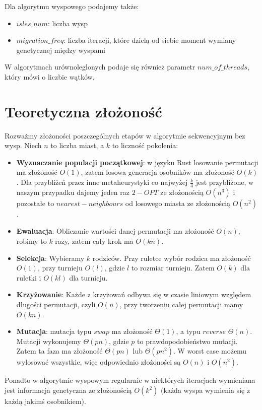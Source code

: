 \documentclass{article}
\begin{document}
Dla algorytmu wyspowego podajemy także:
\begin{itemize}
\item $isles\_num$: liczba wysp 
\item $migration\_freq$: liczba iteracji, które dzielą od siebie moment wymiany genetycznej między wyspami
\end{itemize}

W algorytmach urównoleglonych podaje się również parametr $num\_of\_threads$, który mówi o liczbie wątków.

\section{Teoretyczna złożoność}
Rozważmy złożoności poszczególnych etapów w algorytmie sekwencyjnym bez wysp. Niech $n$ to liczba miast, a $k$ to liczność pokolenia:
\begin{itemize}
\item \textbf{Wyznaczanie populacji początkowej}: w języku Rust losowanie permutacji ma złożoność $O(1)$, zatem losowa generacja osobników ma złożoność $O(k)$. Dla przybliżeń przez inne metaheurystyki co najwyżej $\frac{k}{4}$ jest przybliżone, w naszym przypadku dajemy jeden raz $2-OPT$ ze złożonością $O(n^3)$ i pozostałe to $nearest-neighbours$ od losowego miasta ze złożonością $O(n^2)$.
\item \textbf{Ewaluacja}: Obliczanie wartości danej permutacji ma złożoność $O(n)$, robimy to $k$ razy, zatem cały krok ma $O(kn)$.
\item \textbf{Selekcja}: Wybieramy $k$ rodziców. Przy ruletce wybór rodzica ma złożoność $O(1)$, przy turnieju $O(l)$, gdzie $l$ to rozmiar turnieju. Zatem $O(k)$ dla ruletki i $O(kl)$ dla turnieju.
\item \textbf{Krzyżowanie}: Każde z krzyżowań odbywa się w czasie liniowym względem długości permutacji, czyli $O(n)$, przy tworzeniu całej permutacji mamy $O(kn)$.
\item \textbf{Mutacja}: mutacja typu $swap$ ma złożoność $\Theta(1)$, a typu $reverse$ $\Theta(n)$. Mutacji wykonujemy $\Theta(pn)$, gdzie $p$ to prawdopodobieństwo mutacji. Zatem ta faza ma złożoność $\Theta(pn)$ lub $\Theta(pn^2)$. W worst case możemu wylosować wszystkie, więc odpowiednio złożoności są $O(n)$ i $O(n^2)$.
\end{itemize}
Ponadto w algorytmie wyspowym regularnie w niektórych iteracjach wymieniana jest informacja genetyczna ze złożonością $O(k^2)$ (każda wyspa wymienia się z każdą jakimś osobnikiem).
\end{document}
